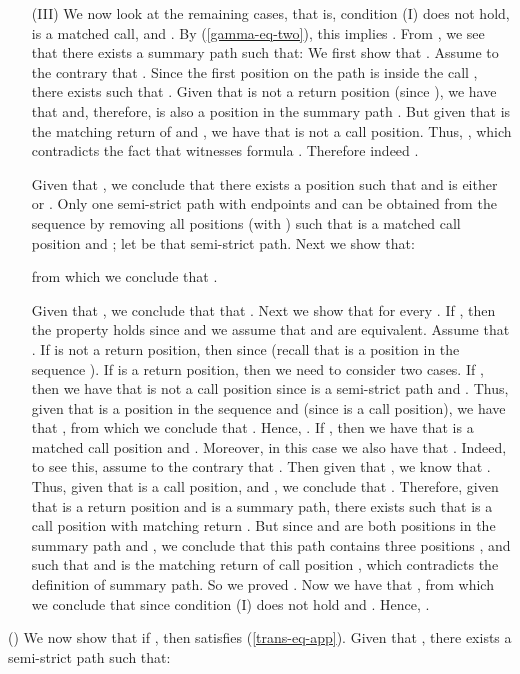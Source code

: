\documentclass{LMCS}
\theoremstyle{plain}
\theoremstyle{definition}
\begin{document}
\begin{enumerate}[(a)]
\item[(III)] We now look at the remaining cases, that is,  condition
  (I) does not hold,  is a matched call, and 
. By
  (\ref{gamma-eq-two}), this implies 
.  
{From} , we see that there exists a summary path
 such that:
{\small
}\noindent
We first show that . Assume to the contrary that . Since the first position on the path is inside the call
, there exists  such that . Given that  is not a return position (since
), we have that  and, therefore,  is also a position in the summary path . But given that  is the matching
return of  and , we have that  is not a
call position. Thus, ,
which contradicts the fact that 
witnesses formula . Therefore indeed .

Given that , we conclude
that there exists a position  such that  and  is either  or . Only one
semi-strict path with endpoints  and  can be
obtained from the sequence  by
removing all positions  (with ) such that 
is a matched call position and ; let  be that semi-strict path. Next we
show that:

from which we conclude that . 

Given that ,
we conclude that that . Next we show that  for every
. If , then the property holds since  and we assume that  and  are
equivalent.  Assume that . If  is not a return
position, then  since  (recall that  is a position in the
sequence ). If  is a return position,
then we need 
to consider two cases. If , then we have that 
is not a call position since  is a
semi-strict path and . Thus, given that
 is a position in the sequence  and  (since  is a call position), we
have that , from which we conclude that
. Hence, . If , then we have that  is
a matched call position and . Moreover, in this
case we also have that . Indeed, to see this, assume to the
contrary that . Then given that , we know that . Thus, given that  is a call position,  and , we conclude that . Therefore, given that  is a return position and  is a summary path, there exists
 such that  is a call position with matching
return . But since  and  are both positions in
the summary path  and , we
conclude that this path 
contains three positions ,  and  such that  and
 is the matching return of call position , which contradicts the
definition of summary path. So we proved  . Now we have that , from which we
conclude that  since condition (I) does
not hold and . Hence, .
\end{enumerate}

\noindent
() We now show that if , then   satisfies (\ref{trans-eq-app}). Given that , there exists a semi-strict path
 such that: 
\end{document}
